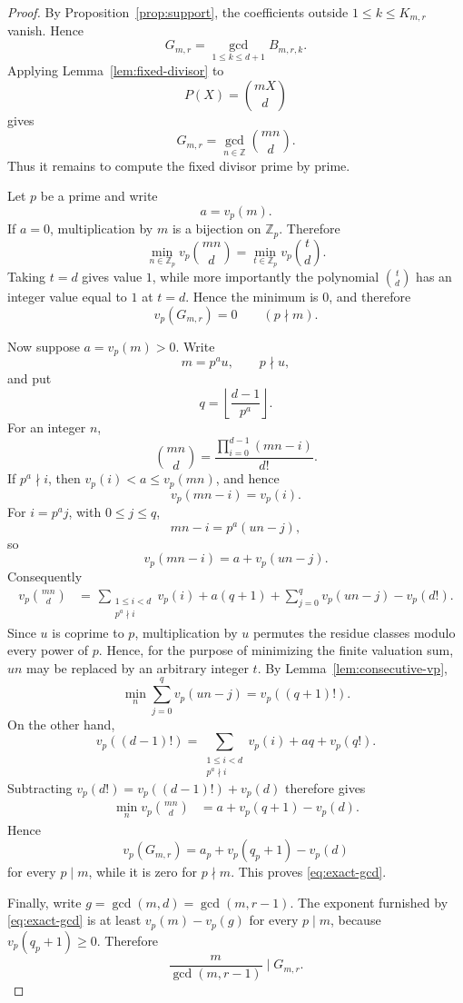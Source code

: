 \documentclass[11pt]{article}
\theoremstyle{definition}
\theoremstyle{remark}
\newcommand{\Z}{\mathbb Z}
\begin{document}
\begin{proof}
By Proposition~\ref{prop:support}, the coefficients outside
$1\le k\le K_{m,r}$ vanish. Hence
\[
 G_{m,r}
 =
 \gcd_{1\le k\le d+1}B_{m,r,k}.
\]
Applying Lemma~\ref{lem:fixed-divisor} to
\[
 P(X)=\binom{mX}{d}
\]
gives
\begin{equation}
\label{eq:fixed-divisor}
 G_{m,r}
 =
 \gcd_{n\in\Z}\binom{mn}{d}.
\end{equation}
Thus it remains to compute the fixed divisor prime by prime.

Let $p$ be a prime and write
\[
 a=v_p(m).
\]
If $a=0$, multiplication by $m$ is a bijection on $\Z_p$. Therefore
\[
 \min_{n\in\Z_p}v_p\binom{mn}{d}
 =
 \min_{t\in\Z_p}v_p\binom{t}{d}.
\]
Taking $t=d$ gives value $1$, while more importantly the polynomial
$\binom{t}{d}$ has an integer value equal to $1$ at $t=d$. Hence the
minimum is $0$, and therefore
\[
 v_p(G_{m,r})=0
 \qquad(p\nmid m).
\]

Now suppose $a=v_p(m)>0$. Write
\[
 m=p^a u,\qquad p\nmid u,
\]
and put
\[
 q=\left\lfloor\frac{d-1}{p^a}\right\rfloor.
\]
For an integer $n$,
\[
 \binom{mn}{d}
 =
 \frac{\prod_{i=0}^{d-1}(mn-i)}{d!}.
\]
If $p^a\nmid i$, then $v_p(i)<a\le v_p(mn)$, and hence
\[
 v_p(mn-i)=v_p(i).
\]
For $i=p^aj$, with $0\le j\le q$,
\[
 mn-i=p^a(un-j),
\]
so
\[
 v_p(mn-i)=a+v_p(un-j).
\]
Consequently
\[
\begin{aligned}
 v_p\binom{mn}{d}
 &=
 \frac{}{}\sum_{\substack{1\le i<d\\p^a\nmid i}}v_p(i)
 +a(q+1)
 +\sum_{j=0}^{q}v_p(un-j)
 -v_p(d!).
\end{aligned}
\]
Since $u$ is coprime to $p$, multiplication by $u$ permutes the residue
classes modulo every power of $p$. Hence, for the purpose of minimizing
the finite valuation sum, $un$ may be replaced by an arbitrary integer
$t$. By Lemma~\ref{lem:consecutive-vp},
\[
 \min_n\sum_{j=0}^{q}v_p(un-j)
 =
 v_p((q+1)!).
\]
On the other hand,
\[
 v_p((d-1)!)
 =
 \sum_{\substack{1\le i<d\\p^a\nmid i}}v_p(i)
 +aq+v_p(q!).
\]
Subtracting $v_p(d!)=v_p((d-1)!)+v_p(d)$ therefore gives
\[
\begin{aligned}
 \min_n v_p\binom{mn}{d}
 &=
 a+v_p(q+1)-v_p(d).
\end{aligned}
\]
Hence
\[
 v_p(G_{m,r})
 =
 a_p+v_p(q_p+1)-v_p(d)
\]
for every $p\mid m$, while it is zero for $p\nmid m$. This proves
\eqref{eq:exact-gcd}.

Finally, write $g=\gcd(m,d)=\gcd(m,r-1)$. The exponent furnished by
\eqref{eq:exact-gcd} is at least $v_p(m)-v_p(g)$ for every $p\mid m$,
because $v_p(q_p+1)\ge0$. Therefore
\[
 \frac{m}{\gcd(m,r-1)}\mid G_{m,r}.
\]
\end{proof}
\end{document}
